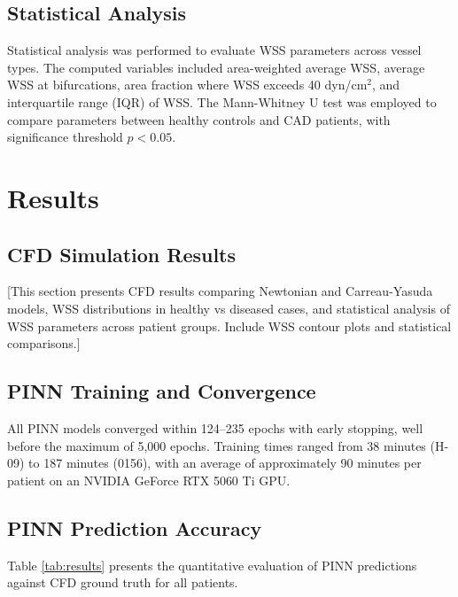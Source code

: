 \documentclass[12pt,a4paper]{article}
\begin{document}
\subsection{Statistical Analysis}

Statistical analysis was performed to evaluate WSS parameters across vessel types. The computed variables included area-weighted average WSS, average WSS at bifurcations, area fraction where WSS exceeds 40 dyn/cm$^2$, and interquartile range (IQR) of WSS. The Mann-Whitney U test was employed to compare parameters between healthy controls and CAD patients, with significance threshold $p < 0.05$.

\section{Results}

\subsection{CFD Simulation Results}

[This section presents CFD results comparing Newtonian and Carreau-Yasuda models, WSS distributions in healthy vs diseased cases, and statistical analysis of WSS parameters across patient groups. Include WSS contour plots and statistical comparisons.]

\subsection{PINN Training and Convergence}

All PINN models converged within 124--235 epochs with early stopping, well before the maximum of 5,000 epochs. Training times ranged from 38 minutes (H-09) to 187 minutes (0156), with an average of approximately 90 minutes per patient on an NVIDIA GeForce RTX 5060 Ti GPU.

\subsection{PINN Prediction Accuracy}

Table \ref{tab:results} presents the quantitative evaluation of PINN predictions against CFD ground truth for all patients.
\end{document}
